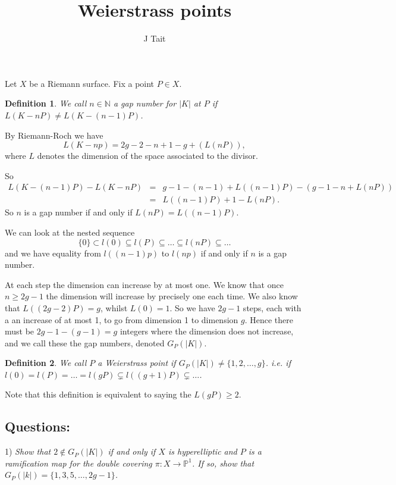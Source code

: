 \documentclass[11pt]{article} %
\title{Weierstrass points}
\author{J Tait}
\newtheorem{defn}{Definition}
\begin{document}
\maketitle
Let $X$ be a Riemann surface.
Fix a point $P\in X$.\\

\begin{defn}
 We call $n \in \mathbb{N}$ a gap number for $|K|$ at $P$ if $L(K-nP) \neq L(K-(n-1)P)$.
\end{defn}

By Riemann-Roch we have
\[
 L(K-np) = 2g-2-n+1-g + (L(nP)),
\]
where $L$ denotes the dimension of the space associated to the divisor.

So 
\begin{eqnarray*}
 L(K-(n-1)P) - L(K-nP) & = & g-1-(n-1) + L((n-1)P) -(g-1-n + L(nP))\\
  & = & L((n-1)P) + 1 - L(nP).
\end{eqnarray*}
So $n$ is a gap number if and only if $L(nP)=L((n-1)P)$.

We can look at the nested sequence 
\[
 \{0\}\subset l(0) \subseteq l(P) \subseteq \ldots \subseteq l(nP) \subseteq \ldots
\]
and we have equality from $l((n-1)p)$ to $l(np)$ if and only if $n$ is a gap number.

At each step the dimension can increase by at most one. We know that once $n \geq 2g-1$ the dimension will increase by precisely one each time.
We also know that $L((2g - 2)P) = g$, whilst $L(0) = 1$. So we have $2g-1$ steps, each with a an increase of at most 1, to go from dimension 1 to dimension $g$.
Hence there must be $2g-1 - (g-1)=g$ integers where the dimension does not increase, and we call these the gap numbers, denoted $G_P(|K|)$.\\

\begin{defn}
 We call $P$ a Weierstrass point if $G_P(|K|) \neq \{1,2,\ldots, g\}$. 
 i.e. if $l(0)=l(P)=\ldots = l(gP) \subsetneq l((g+1)P) \subsetneq \ldots $.
\end{defn}

Note that this definition is equivalent to saying the $L(gP)\geq 2$.

\subsection{Questions:}
1) {\em Show that $2\notin G_P(|K|)$ if and only if $X$ is hyperelliptic and $P$ is a ramification map for the double covering $\pi: X\rightarrow \mathbb P^1$.
If so, show that $G_P(|k|) = \{1,3,5,\ldots ,2g-1\}$.}
\end{document}
